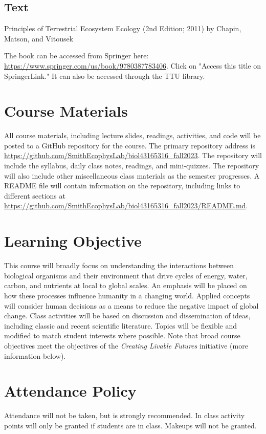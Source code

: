 \documentclass[12pt, notitlepage]{article}   	%
\begin{document}
{\subsection{Text}
Principles of Terrestrial Ecosystem Ecology (2nd Edition; 2011) 
by Chapin, Matson, and Vitousek \par
The book can be accessed from Springer here: 
\url{https://www.springer.com/us/book/9780387783406}. Click on "Access this title on 
SpringerLink." It can also be accessed through the TTU library.

\section{Course Materials}
All course materials, including lecture slides, readings, activities, and code 
will be posted to a GitHub repository for the course.
The primary repository address is
\url{https://github.com/SmithEcophysLab/biol43165316_fall2023}.
The repository will include the syllabus, daily class notes, readings, and mini-quizzes.
The repository will also include other miscellaneous class materials as the semester
progresses. A README file will contain information on the repository, including
links to different sections at 
\url{https://github.com/SmithEcophysLab/biol43165316_fall2023/README.md}.

\section{Learning Objective}
This course will broadly focus on understanding the interactions between biological
organisms and their environment that drive cycles of energy, water, carbon, and nutrients
at local to global scales.
An emphasis will be placed on how these processes influence humanity in a changing world.
Applied concepts will consider human decisions as a means to reduce the negative impact
of global change. Class activities will be based on discussion and dissemination of ideas, 
including classic and recent scientific literature. 
Topics will be flexible and modified to match student interests where possible.
Note that broad course objectives meet the objectives of the \textit{Creating Livable Futures}
initiative (more information below).

\section{Attendance Policy}
Attendance will not be taken, but is strongly recommended. 
In class activity points will only be granted if students are in class.
Makeups will not be granted.

}
\end{document}
